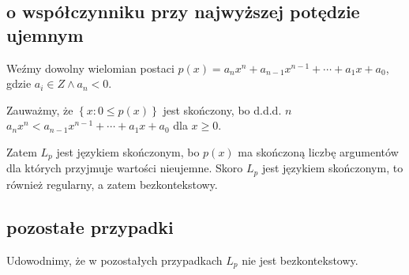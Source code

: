 \documentclass{article}
\theoremstyle{definition}
\theoremstyle{remark}
\begin{document}
\subsection{o współczynniku przy najwyższej potędzie ujemnym}

Weźmy dowolny wielomian postaci \( p(x)=a_n x^n + a_{n-1}x^{n-1} + \cdots + a_1x + a_0\), gdzie \(a_i \in Z \land a_n < 0\).

Zauważmy, że \(\left\{ x: 0 \leq p(x) \right\}\) jest skończony, bo d.d.d. \(n\) \(a_n x^n < a_{n-1}x^{n-1} + \cdots + a_1x + a_0\) dla \(x \geq 0\).

Zatem \(L_p\) jest językiem skończonym, bo \(p(x)\) ma skończoną liczbę argumentów
dla których przyjmuje wartości nieujemne.
Skoro \(L_p\) jest językiem skończonym, to również regularny, a zatem bezkontekstowy.

\subsection{pozostałe przypadki}

Udowodnimy, że w pozostałych przypadkach \(L_p\) nie jest bezkontekstowy.
\end{document}
